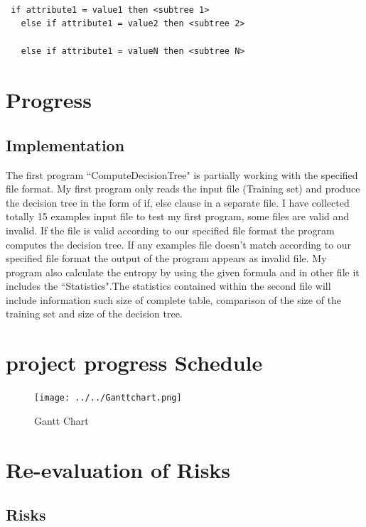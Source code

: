 \documentclass{report}
\begin{document}
\begin{lstlisting}

 if attribute1 = value1 then <subtree 1>
   else if attribute1 = value2 then <subtree 2>
   
   else if attribute1 = valueN then <subtree N>

\end{lstlisting}

\chapter{Progress}
\label{cha:pro}

\section{Implementation}
 
The first program ``ComputeDecisionTree" is partially working with the specified file format. My first program only reads the input file (Training set) and produce the decision tree in the form of if, else clause in a separate file. I have collected totally 15 examples input file to test my first program, some files are valid and invalid. If the file is valid according to our specified file format the program computes the decision tree. If any examples file doesn't match according to our specified file format   the output of the program appears as invalid file.
My program also calculate the entropy by using the given formula and in other file it includes the ``Statistics".The statistics contained within the second file will include information such  size of complete table, comparison of the size of the training set and size of the decision tree.

\chapter{project progress Schedule}
\label{cha:pro}


\begin{figure}[h]

\centering
\texttt{[image: ../../Ganttchart.png]}
\caption{Gantt Chart}
\end{figure}


\chapter{Re-evaluation of Risks }
\label{cha:risk}

\section{Risks}
\label{sec:risks}
\end{document}
